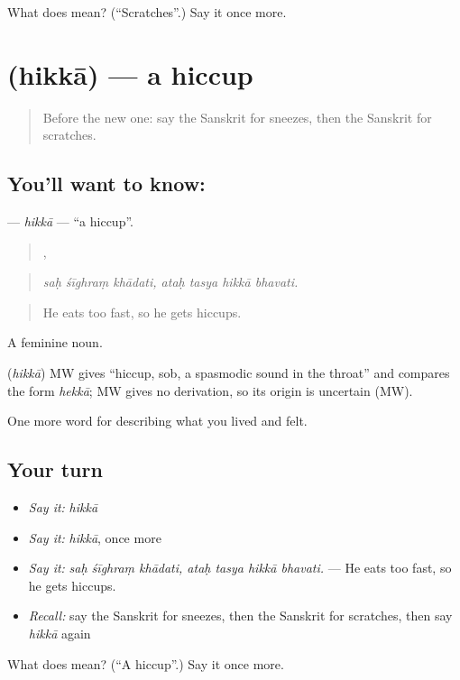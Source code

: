\begin{tcolorbox}[breakable,colback=teal!4,colframe=teal!35!black,title={Before you move on}]
What does  mean? (\textquotedblleft{}Scratches\textquotedblright{}.) Say it once more.
\end{tcolorbox}
\section[\texorpdfstring{\sk{हिक्का} (hikkā)}{हिक्का (hikkā)}]{ (hikkā) — a hiccup}

\label{lesson:SA-C475-hikka}



\begin{quote}
Before the new one: say the Sanskrit for sneezes, then the Sanskrit for scratches.
\end{quote}

\subsection*{You'll want to know: }
\textbf{} — \emph{hikkā} — \textquotedblleft{}a hiccup\textquotedblright{}.

\begin{quote}
  ,    
\end{quote}

\begin{quote}
\emph{saḥ śīghraṃ khādati, ataḥ tasya hikkā bhavati.}
\end{quote}

\begin{quote}
He eats too fast, so he gets hiccups.
\end{quote}

A feminine noun.

\begin{cousinweb}
\textbf{} (\emph{hikkā}) MW gives \textquotedblleft{}hiccup, sob, a spasmodic sound in the throat\textquotedblright{} and compares the form \emph{hekkā}; MW gives no derivation, so its origin is uncertain (MW).
\end{cousinweb}

\begin{grammarlens}[title={What you've built}]
One more word for describing what you lived and felt.
\end{grammarlens}

\subsection*{Your turn}
\begin{itemize}
\raggedright
  \item \emph{Say it:} \emph{hikkā}
  \item \emph{Say it:} \emph{hikkā}, once more
  \item \emph{Say it:} \emph{saḥ śīghraṃ khādati, ataḥ tasya hikkā bhavati.} — He eats too fast, so he gets hiccups.
  \item \emph{Recall:} say the Sanskrit for sneezes, then the Sanskrit for scratches, then say \emph{hikkā} again
\end{itemize}

\begin{tcolorbox}[breakable,colback=teal!4,colframe=teal!35!black,title={Before you move on}]
What does  mean? (\textquotedblleft{}A hiccup\textquotedblright{}.) Say it once more.
\end{tcolorbox}
